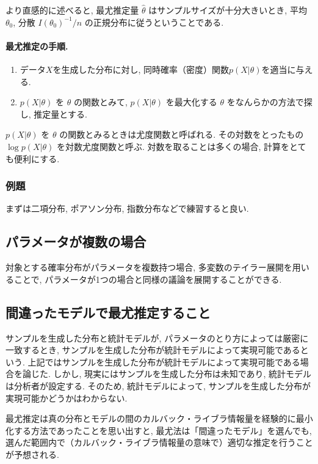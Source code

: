 \documentclass[a4paper, 12pt]{jarticle}
\begin{document}
より直感的に述べると, 最尤推定量 $\hat \theta$ はサンプルサイズが十分大きいとき, 平均 $\theta_0$, 分散 $I(\theta_0)^{-1}/n$ の正規分布に従うということである. 

\paragraph{最尤推定の手順.} 
\begin{enumerate}
\item データ$X$を生成した分布に対し, 同時確率（密度）関数$p(X|\theta)$を適当に与える. 
\item $p(X|\theta)$ を $\theta$ の関数とみて, $p(X|\theta)$ を最大化する $\theta$ をなんらかの方法で探し, 推定量とする.
\end{enumerate}
$p(X|\theta)$ を $\theta$ の関数とみるときは尤度関数と呼ばれる. その対数をとったもの $\log p(X|\theta)$ を対数尤度関数と呼ぶ. 対数を取ることは多くの場合, 計算をとても便利にする. 

\subsubsection{例題}
まずは二項分布, ポアソン分布, 指数分布などで練習すると良い.

\subsection{パラメータが複数の場合}

対象とする確率分布がパラメータを複数持つ場合, 多変数のテイラー展開を用いることで, パラメータが1つの場合と同様の議論を展開することができる. 



\subsection{間違ったモデルで最尤推定すること}
サンプルを生成した分布と統計モデルが, パラメータのとり方によっては厳密に一致するとき, サンプルを生成した分布が統計モデルによって実現可能であるという. 
上記ではサンプルを生成した分布が統計モデルによって実現可能である場合を論じた. しかし, 現実にはサンプルを生成した分布は未知であり, 統計モデルは分析者が設定する. そのため, 統計モデルによって, サンプルを生成した分布が実現可能かどうかはわからない. 

最尤推定は真の分布とモデルの間のカルバック・ライブラ情報量を経験的に最小化する方法であったことを思い出すと, 最尤法は「間違ったモデル」を選んでも, 選んだ範囲内で（カルバック・ライブラ情報量の意味で）適切な推定を行うことが予想される. 
\end{document}
